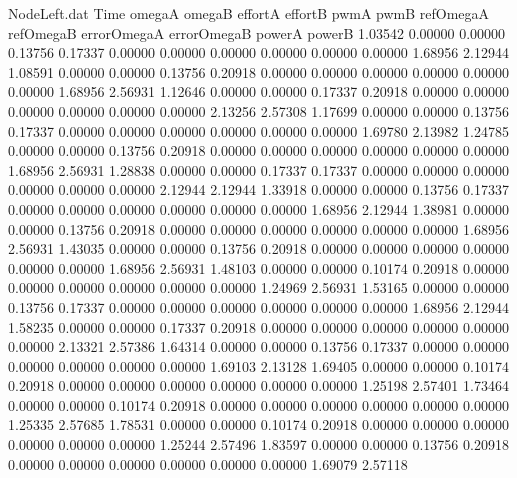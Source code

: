 \begin{filecontents}{NodeLeft.dat}
Time omegaA omegaB effortA effortB pwmA pwmB refOmegaA refOmegaB errorOmegaA errorOmegaB powerA powerB
   1.03542    0.00000    0.00000     0.13756    0.17337    0.00000    0.00000    0.00000    0.00000    0.00000    0.00000    1.68956    2.12944
   1.08591    0.00000    0.00000     0.13756    0.20918    0.00000    0.00000    0.00000    0.00000    0.00000    0.00000    1.68956    2.56931
   1.12646    0.00000    0.00000     0.17337    0.20918    0.00000    0.00000    0.00000    0.00000    0.00000    0.00000    2.13256    2.57308
   1.17699    0.00000    0.00000     0.13756    0.17337    0.00000    0.00000    0.00000    0.00000    0.00000    0.00000    1.69780    2.13982
   1.24785    0.00000    0.00000     0.13756    0.20918    0.00000    0.00000    0.00000    0.00000    0.00000    0.00000    1.68956    2.56931
   1.28838    0.00000    0.00000     0.17337    0.17337    0.00000    0.00000    0.00000    0.00000    0.00000    0.00000    2.12944    2.12944
   1.33918    0.00000    0.00000     0.13756    0.17337    0.00000    0.00000    0.00000    0.00000    0.00000    0.00000    1.68956    2.12944
   1.38981    0.00000    0.00000     0.13756    0.20918    0.00000    0.00000    0.00000    0.00000    0.00000    0.00000    1.68956    2.56931
   1.43035    0.00000    0.00000     0.13756    0.20918    0.00000    0.00000    0.00000    0.00000    0.00000    0.00000    1.68956    2.56931
   1.48103    0.00000    0.00000     0.10174    0.20918    0.00000    0.00000    0.00000    0.00000    0.00000    0.00000    1.24969    2.56931
   1.53165    0.00000    0.00000     0.13756    0.17337    0.00000    0.00000    0.00000    0.00000    0.00000    0.00000    1.68956    2.12944
   1.58235    0.00000    0.00000     0.17337    0.20918    0.00000    0.00000    0.00000    0.00000    0.00000    0.00000    2.13321    2.57386
   1.64314    0.00000    0.00000     0.13756    0.17337    0.00000    0.00000    0.00000    0.00000    0.00000    0.00000    1.69103    2.13128
   1.69405    0.00000    0.00000     0.10174    0.20918    0.00000    0.00000    0.00000    0.00000    0.00000    0.00000    1.25198    2.57401
   1.73464    0.00000    0.00000     0.10174    0.20918    0.00000    0.00000    0.00000    0.00000    0.00000    0.00000    1.25335    2.57685
   1.78531    0.00000    0.00000     0.10174    0.20918    0.00000    0.00000    0.00000    0.00000    0.00000    0.00000    1.25244    2.57496
   1.83597    0.00000    0.00000     0.13756    0.20918    0.00000    0.00000    0.00000    0.00000    0.00000    0.00000    1.69079    2.57118

\end{filecontents}
